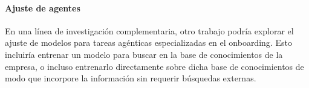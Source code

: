 \paragraph{Ajuste de agentes} En una línea de investigación complementaria, otro trabajo podría explorar el ajuste de modelos para tareas agénticas especializadas en el onboarding. Esto incluiría entrenar un modelo para buscar en la base de conocimientos de la empresa, o incluso entrenarlo directamente sobre dicha base de conocimientos de modo que incorpore la información sin requerir búsquedas externas.
